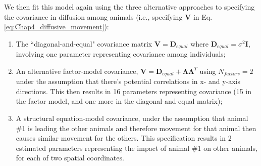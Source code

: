 We then fit this model again using the three alternative approaches to specifying the covariance in diffusion among animals (i.e., specifying \( \mathbf{V} \) in Eq. \ref{eq:Chap4_diffusive_movement}):
\begin{enumerate}
    \item The ``diagonal-and-equal" covariance matrix \( \mathbf{V} = \mathbf{D}_{equal} \) where \(\mathbf{D}_{equal} = \sigma^2 \mathbf{I} \), involving one parameter representing covariance among individuals;

    \item An alternative factor-model covariance, \( \mathbf{V} = \mathbf{D}_{equal} + \mathbf{\Lambda \Lambda}^T \) using \( N_{factors}=2 \) under the assumption that there's potential correlations in x- and y-axis directions.  This then results in 16 parameters representing covariance (15 in the factor model, and one more in the diagonal-and-equal matrix);

    \item A structural equation-model covariance, under the assumption that animal \#1 is leading the other animals and therefore movement for that animal then causes similar movement for the others.  This specification results in 2 estimated parameters representing the impact of animal \#1 on other animals, for each of two spatial coordinates.  
\end{enumerate}
